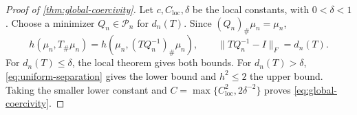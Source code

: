 \begin{proof}[Proof of \cref{thm:global-coercivity}]
Let $c,C_{\mathrm{loc}},\delta$ be the local
constants, with $0<\delta<1$.  Choose a minimizer
$Q_n\in\mathcal P_n$ for $d_n(T)$.  Since
\((Q_n)_\#\mu_n=\mu_n\),
\[
 h(\mu_n,T_\#\mu_n)
 =h(\mu_n,(TQ_n^{-1})_\#\mu_n),
 \qquad
 \|TQ_n^{-1}-I\|_F=d_n(T).
\]
For \(d_n(T)\le\delta\), the local theorem gives both bounds.
For \(d_n(T)>\delta\),
\eqref{eq:uniform-separation} gives the lower bound and \(h^2\le2\) the upper
bound.  Taking the smaller
lower constant and
\(C=\max\{C_{\mathrm{loc}}^2,2\delta^{-2}\}\) proves
\eqref{eq:global-coercivity}.
\end{proof}
